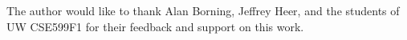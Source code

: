 \documentclass[sigplan,10pt]{acmart}\settopmatter{printfolios=true}
\begin{document}










\begin{acks}                            %
  The author would like to thank Alan Borning, Jeffrey Heer, and the students of UW CSE599F1 for their feedback and support on this work.
\end{acks}






\end{document}

